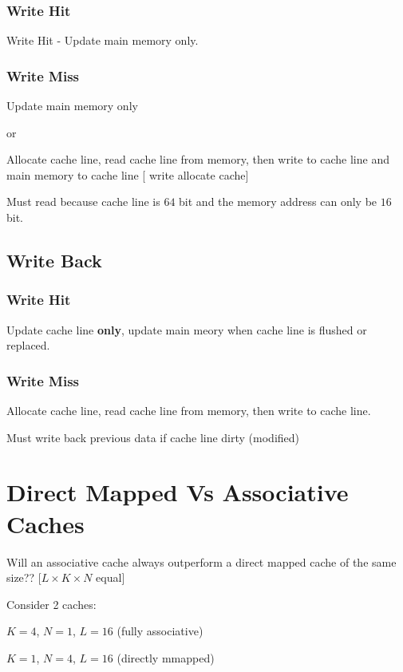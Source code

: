 \documentclass[a4paper,12pt]{article}
\begin{document}
\subsubsection*{Write Hit}

Write Hit - Update main memory only.

\subsubsection*{Write Miss}

Update main memory only 

or

Allocate cache line, read cache line from memory, then write to cache
line and main memory to cache line [ write allocate cache]

Must read because cache line is $64$ bit and the memory address can only
be $16$ bit.

\subsection*{Write Back}

\subsubsection*{Write Hit}

Update cache line \textbf{only}, update main meory when cache line is
flushed or replaced.

\subsubsection*{Write Miss}

Allocate cache line, read cache line from memory, then write to cache
line.

Must write back previous data if cache line dirty (modified)

\section*{Direct Mapped Vs Associative Caches}

Will an associative cache always outperform a direct mapped cache
of the same size?? [$L \times K \times N $ equal]

Consider 2 caches:

$K = 4$, $N = 1$, $L = 16$ (fully associative)

$K = 1$, $N = 4$, $L = 16$ (directly mmapped)
\end{document}
